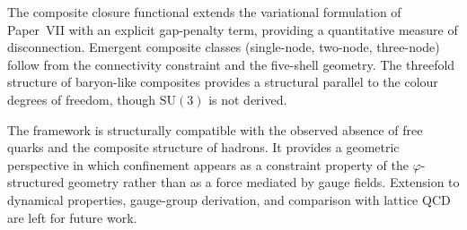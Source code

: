 \documentclass[12pt]{article}
\newcommand{\phig}{\varphi}
\begin{document}
The composite closure functional extends the variational formulation of Paper~VII with an explicit gap-penalty term, providing a quantitative measure of disconnection. Emergent composite classes (single-node, two-node, three-node) follow from the connectivity constraint and the five-shell geometry. The threefold structure of baryon-like composites provides a structural parallel to the colour degrees of freedom, though $\mathrm{SU}(3)$ is not derived.

The framework is structurally compatible with the observed absence of free quarks and the composite structure of hadrons. It provides a geometric perspective in which confinement appears as a constraint property of the $\phig$-structured geometry rather than as a force mediated by gauge fields. Extension to dynamical properties, gauge-group derivation, and comparison with lattice QCD are left for future work.



\end{document}
